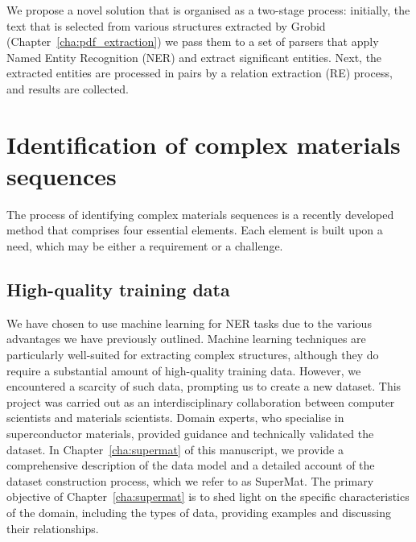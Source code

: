 We propose a novel solution that is organised as a two-stage process: initially, the text that is selected from various structures extracted by Grobid (Chapter~\ref{cha:pdf_extraction}) we pass them to a set of parsers that apply Named Entity Recognition (NER) and extract significant entities.
Next, the extracted entities are processed in pairs by a relation extraction (RE) process, and results are collected.


\section{Identification of complex materials sequences}
\label{subsec:ner-solution}

The process of identifying complex materials sequences is a recently developed method that comprises four essential elements. Each element is built upon a need, which may be either a requirement or a challenge.

\subsection{High-quality training data}
We have chosen to use machine learning for NER tasks due to the various advantages we have previously outlined. Machine learning techniques are particularly well-suited for extracting complex structures, although they do require a substantial amount of high-quality training data. However, we encountered a scarcity of such data, prompting us to create a new dataset. This project was carried out as an interdisciplinary collaboration between computer scientists and materials scientists. Domain experts, who specialise in superconductor materials, provided guidance and technically validated the dataset. In Chapter~\ref{cha:supermat} of this manuscript, we provide a comprehensive description of the data model and a detailed account of the dataset construction process, which we refer to as SuperMat. The primary objective of Chapter~\ref{cha:supermat} is to shed light on the specific characteristics of the domain, including the types of data, providing examples and discussing their relationships.

